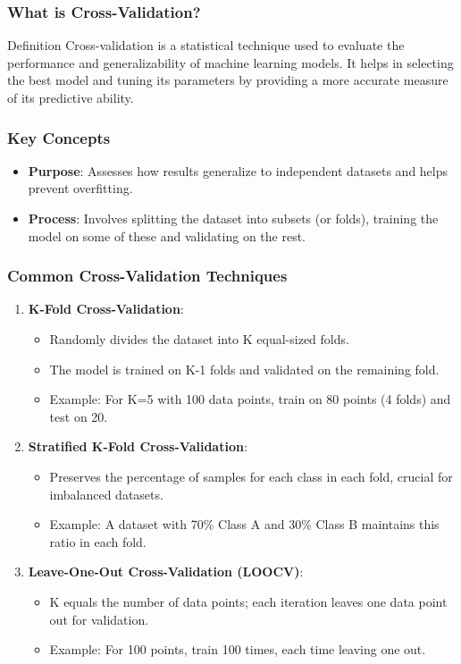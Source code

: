 \documentclass[aspectratio=169]{beamer}
\begin{document}
\begin{frame}[fragile]
    \frametitle{What is Cross-Validation?}
    \begin{block}{Definition}
        Cross-validation is a statistical technique used to evaluate the performance and generalizability of machine learning models. 
        It helps in selecting the best model and tuning its parameters by providing a more accurate measure of its predictive ability.
    \end{block}
\end{frame}

\begin{frame}[fragile]
    \frametitle{Key Concepts}
    \begin{itemize}
        \item \textbf{Purpose}: Assesses how results generalize to independent datasets and helps prevent overfitting.
        \item \textbf{Process}: Involves splitting the dataset into subsets (or folds), training the model on some of these and validating on the rest.
    \end{itemize}
\end{frame}

\begin{frame}[fragile]
    \frametitle{Common Cross-Validation Techniques}
    \begin{enumerate}
        \item \textbf{K-Fold Cross-Validation}:
        \begin{itemize}
            \item Randomly divides the dataset into K equal-sized folds.
            \item The model is trained on K-1 folds and validated on the remaining fold.
            \item Example: For K=5 with 100 data points, train on 80 points (4 folds) and test on 20.
        \end{itemize}
        
        \item \textbf{Stratified K-Fold Cross-Validation}:
        \begin{itemize}
            \item Preserves the percentage of samples for each class in each fold, crucial for imbalanced datasets.
            \item Example: A dataset with 70\% Class A and 30\% Class B maintains this ratio in each fold.
        \end{itemize}
        
        \item \textbf{Leave-One-Out Cross-Validation (LOOCV)}:
        \begin{itemize}
            \item K equals the number of data points; each iteration leaves one data point out for validation.
            \item Example: For 100 points, train 100 times, each time leaving one out.
        \end{itemize}
    \end{enumerate}
\end{frame}
\end{document}
